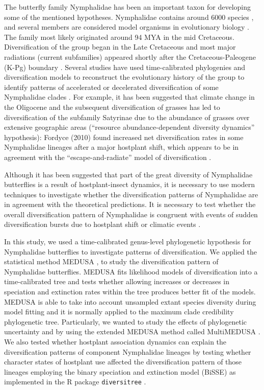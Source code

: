 \documentclass[10pt]{article}
\begin{document}
The butterfly family Nymphalidae has been an important taxon for
developing some of the mentioned hypotheses. Nymphalidae contains around
6000 species \cite{van_nieukerken2011}, and several members are considered model organisms
in evolutionary biology \cite{joron2006, willmott2006, brakefield2009}.
The family most likely originated
around 94 MYA in the mid Cretaceous. Diversification of the group began
in the Late Cretaceous and most major radiations (current subfamilies)
appeared shortly after the Cretaceous-Paleogene (K-Pg) boundary
\cite{heikkila2012}. Several studies have used time-calibrated phylogenies and
diversification models to reconstruct the evolutionary history of the
group to identify patterns of accelerated or decelerated diversification
of some Nymphalidae clades \cite{heikkila2012, elias2009, fordyce2010, wahlberg2009}.
For example, it has been
suggested that climate change in the Oligocene and the subsequent
diversification of grasses has led to diversification of the subfamily
Satyrinae \cite{pena2008} due to the abundance of grasses over extensive
geographic areas (``resource abundance-dependent diversity dynamics''
hypothesis): Fordyce (2010) \cite{fordyce2010} found increased net diversification
rates in some Nymphalidae lineages after a major hostplant shift, which
appears to be in agreement with the ``escape-and-radiate'' model of
diversification \cite{ehrlich1964}.

Although it has been suggested that part of the great diversity of
Nymphalidae butterflies is a result of hostplant-insect dynamics, it is
necessary to use modern techniques to investigate whether the
diversification patterns of Nymphalidae are in agreement with the
theoretical predictions. It is necessary to test whether the overall
diversification pattern of Nymphalidae is congruent with events of
sudden diversification bursts due to hostplant shift or climatic events
\cite{nylin2014, ferrer2013}.

In this study, we used a time-calibrated genus-level phylogenetic
hypothesis for Nymphalidae butterflies \cite{wahlberg2009} to investigate patterns
of diversification. We applied the statistical method MEDUSA
\cite{alfaro2009, harmon2011}, to study the diversification pattern of Nymphalidae
butterflies. MEDUSA fits likelihood models of diversification into a
time-calibrated tree and tests whether allowing increases or decreases
in speciation and extinction rates within the tree produces better fit
of the models. MEDUSA is able to take into account unsampled extant
species diversity during model fitting and it is normally applied to the
maximum clade credibility phylogenetic tree. Particularly, we wanted to
study the effects of phylogenetic uncertainty and by using the extended
MEDUSA method called MultiMEDUSA \cite{alfaro2009}. We also tested whether
hostplant association dynamics can explain the diversification patterns
of component Nymphalidae lineages by testing whether character states of
hostplant use affected the diversification pattern of those lineages
employing the binary speciation and extinction model (BiSSE) as
implemented in the R package \texttt{diversitree} \cite{fitzjohn2012}.
\end{document}
